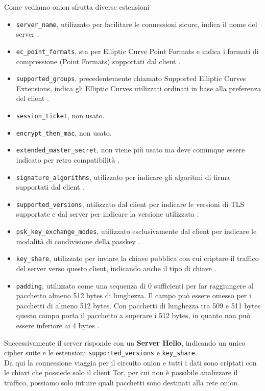 \cite{TLSv1_3}
\newpage
Come vediamo onion sfrutta diverse estensioni
\begin{itemize}
    \item \lstinline{server_name}, utilizzato per facilitare le connessioni sicure, indica il nome del server \cite{RFC6066}.
    \item \lstinline{ec_point_formats}, sta per Elliptic Curve Point Formats e indica i formati di compressione (Point Formats) supportati dal client \cite{RFC8422}.
    \item \lstinline{supported_groups}, precedentemente chiamato Supported Elliptic Curves Extensions, indica gli Elliptic Curves utilizzati ordinati in base alla preferenza del client \cite{RFC8422}.
    \item \lstinline{session_ticket}, non usato.
    \item \lstinline{encrypt_then_mac}, non usato.
    \item \lstinline{extended_master_secret}, non viene più usato ma deve comunque essere indicato per retro compatibilità \cite{RFC7627}.
    \item \lstinline{signature_algorithms}, utilizzato per indicare gli algoritmi di firma supportati dal client \cite{RFC8446}.
    \item \lstinline{supported_versions}, utilizzato dal client per indicare le versioni di TLS supportate e dal server per indicare la versione utilizzata \cite{RFC8446}.
    \item \lstinline{psk_key_exchange_modes}, utilizzato esclusivamente dal client per indicare le modalità di condivisione della passkey \cite{RFC8446}.
    \item \lstinline{key_share}, utilizzato per inviare la chiave pubblica con cui criptare il traffico del server verso questo client, indicando anche il tipo di chiave \cite{RFC8446}.
    \item \lstinline{padding}, utilizzato come una sequenza di 0 sufficienti per far raggiungere al pacchetto almeno 512 bytes di lunghezza. Il campo può essere omesso per i pacchetti di almeno 512 bytes. Con pacchetti di lunghezza tra 509 e 511 bytes questo campo porta il pacchetto a superare i 512 bytes, in quanto non può essere inferiore ai 4 bytes \cite{RFC7685}.
\end{itemize}
\newpage
Successivamente il server risponde con un \textbf{Server Hello}, indicando un unico cipher suite e le estensioni \lstinline{supported_versions} e \lstinline{key_share}.
\\
Da qui la connessione viaggia per il circuito onion e tutti i dati sono criptati con le chiavi che possiede solo il client Tor, per cui non è possibile analizzare il traffico, possiamo solo intuire quali pacchetti sono destinati alla rete onion.



